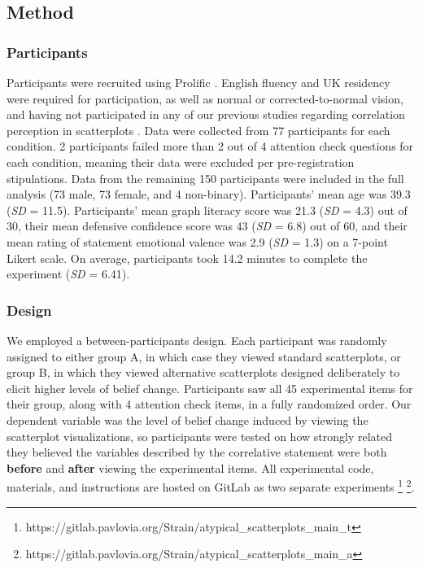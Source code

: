 \documentclass[sigconf]{acmart}
\begin{document}
\subsection{Method}\label{sec-method-main}

\subsubsection{Participants}\label{sec-participants-main}

Participants were recruited using Prolific \citep{prolific}. English
fluency and UK residency were required for participation, as well as
normal or corrected-to-normal vision, and having not participated in any
of our previous studies regarding correlation perception in scatterplots
\citep{strain_2023, strain_2023b, strain_2024}. Data were collected from
77 participants for each condition. 2 participants failed more than 2
out of 4 attention check questions for each condition, meaning their
data were excluded per pre-registration stipulations. Data from the
remaining 150 participants were included in the full analysis (73 male,
73 female, and 4 non-binary). Participants' mean age was 39.3 (\emph{SD}
= 11.5). Participants' mean graph literacy score was 21.3 (\emph{SD} =
4.3) out of 30, their mean defensive confidence score was 43 (\emph{SD}
= 6.8) out of 60, and their mean rating of statement emotional valence
was 2.9 (\emph{SD} = 1.3) on a 7-point Likert scale. On average,
participants took 14.2 minutes to complete the experiment (\emph{SD} =
6.41).

\subsubsection{Design}\label{sec-design-main}

We employed a between-participants design. Each participant was randomly
assigned to either group A, in which case they viewed standard
scatterplots, or group B, in which they viewed alternative scatterplots
designed deliberately to elicit higher levels of belief change.
Participants saw all 45 experimental items for their group, along with 4
attention check items, in a fully randomized order. Our dependent
variable was the level of belief change induced by viewing the
scatterplot visualizations, so participants were tested on how strongly
related they believed the variables described by the correlative
statement were both \textbf{before} and \textbf{after} viewing the
experimental items. All experimental code, materials, and instructions
are hosted on GitLab as two separate experiments \footnote{https://gitlab.pavlovia.org/Strain/atypical\_scatterplots\_main\_t}
\footnote{https://gitlab.pavlovia.org/Strain/atypical\_scatterplots\_main\_a}.
\end{document}
